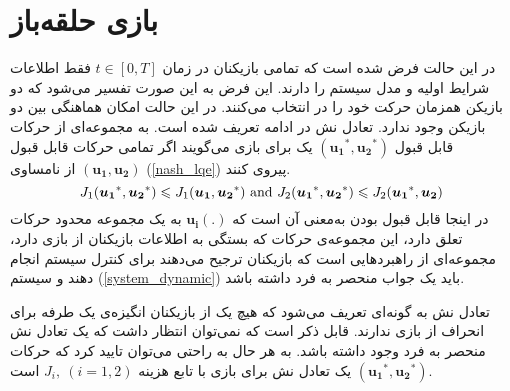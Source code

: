 \section{بازی حلقه‌باز}\label{openloop_game}
در این حالت فرض شده است که تمامی بازیکنان در زمان 
$t \in [0, T]$
فقط اطلاعات شرایط اولیه و مدل سیستم را دارند. این فرض به این صورت تفسیر می‌شود که دو بازیکن همزمان حرکت خود را در انتخاب می‌کنند. در این حالت امکان هماهنگی بین دو بازیکن وجود ندارد. تعادل نش در ادامه تعریف شده ‌است.
به مجموعه‌ای از حرکات قابل قبول 
$(\boldsymbol{u_1}^*,  \boldsymbol{u_2}^*)$
یک  برای بازی می‌گویند اگر تمامی حرکات قابل قبول 
$(\boldsymbol{u_1},  \boldsymbol{u_2})$
از نامساوی (\ref{nash_lqe}) پیروی کنند.
\begin{equation}\label{nash_lqe}
	J_1(\boldsymbol{u_1}^*, \boldsymbol{u_2}^*)\leq J_1(\boldsymbol{u_1}, \boldsymbol{u_2}^*) \text{\rm{ and }}
	J_2(\boldsymbol{u_1}^*, \boldsymbol{u_2}^*)\leq 
	J_2(\boldsymbol{u_1}^*, \boldsymbol{u_2})
\end{equation}
در اینجا قابل قبول بودن به‌معنی آن است که
$\boldsymbol{u_i}(.)$
به یک مجموعه محدود حرکات تعلق دارد، این مجموعه‌ی حرکات که بستگی به اطلاعات بازیکنان از بازی دارد، مجموعه‌ای از راهبردهایی است که بازیکنان ترجیح می‌دهند برای کنترل سیستم انجام دهند و سیستم 
(\ref{system_dynamic})
باید یک جواب منحصر به فرد داشته باشد. 


تعادل نش به گونه‌ای تعریف می‌شود که هیچ یک از بازیکنان انگیزه‌ی یک طرفه برای انحراف از بازی ندارند. قابل ذکر است که نمی‌توان انتظار داشت که یک تعادل نش منحصر به فرد وجود داشته باشد. به هر حال به راحتی می‌توان تایید کرد که حرکات
$(\boldsymbol{u_1}^*, \boldsymbol{u_2}^*)$
یک تعادل نش برای بازی با تابع هزینه
$J_i,~ (i = 1, 2)$
است.


